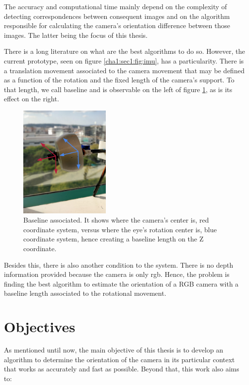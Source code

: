 The accuracy and computational time mainly depend on the complexity of detecting correspondences between consequent images and on the algorithm responsible for calculating the camera's orientation difference between those images. The latter being the focus of this thesis.

There is a long literature on what are the best algorithms to do so. However, the current prototype, seen on figure \ref{cha1:sec1:fig:imu}, has a particularity. There is a translation movement associated to the camera movement that may be defined as a function of the rotation and the fixed length of the camera’s support. To that length, we call baseline and is observable on the left of figure \ref{cha1:sec1:fig:baseline}, as is its effect on the right.

\begin{figure}[ht]
	\centering
	\includegraphics[width=0.4\textwidth]{images/prototypeaxis.png}
	\caption[Baseline associated]{Baseline associated. It shows where the camera's center is, red coordinate system, versus where the eye's rotation center is, blue coordinate system, hence creating a baseline length on the Z coordinate.}
	\label{cha1:sec1:fig:baseline}
\end{figure}

Besides this, there is also another condition to the system. There is no depth information provided because the camera is only \acrshort{rgb}. Hence, the problem is finding the best algorithm to estimate the orientation of a RGB camera with a baseline length associated to the rotational movement.

\section{Objectives}
\label{cha1:objectives}

As mentioned until now, the main objective of this thesis is to develop an algorithm to determine the orientation of the camera in its particular context that works as accurately and fast as possible. Beyond that, this work also aims to:

